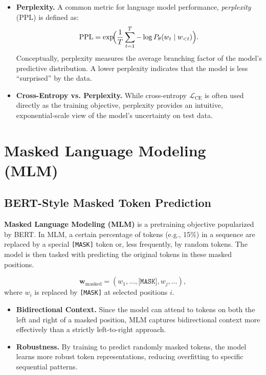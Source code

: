 \begin{itemize}
    \item \textbf{Perplexity.}
    A common metric for language model performance, \emph{perplexity} (PPL) is defined as:
    \[
    \text{PPL} = \exp\!\Bigl(\frac{1}{T}\sum_{t=1}^T -\log P_{\theta}(w_t \mid w_{<t})\Bigr).
    \]
    Conceptually, perplexity measures the average branching factor of the model’s predictive distribution. A lower perplexity indicates that the model is less “surprised” by the data. 
    \item \textbf{Cross-Entropy vs. Perplexity.}
    While cross-entropy \(\mathcal{L}_\text{CE}\) is often used directly as the training objective, perplexity provides an intuitive, exponential-scale view of the model’s uncertainty on test data.
\end{itemize}


\section{Masked Language Modeling (MLM)}
\label{sec:mlm}

\subsection{BERT-Style Masked Token Prediction}
\noindent
\textbf{Masked Language Modeling (MLM)} is a pretraining objective popularized by BERT. In MLM, a certain percentage of tokens (e.g., 15\%) in a sequence are replaced by a special \texttt{[MASK]} token or, less frequently, by random tokens. The model is then tasked with predicting the original tokens in these masked positions.

\[
\mathbf{w}_{\text{masked}} = (w_1, \ldots, \texttt{[MASK]}, w_{j}, \ldots),
\]
where \(w_i\) is replaced by \texttt{[MASK]} at selected positions \(i\). 

\begin{itemize}
    \item \textbf{Bidirectional Context.}
    Since the model can attend to tokens on both the left and right of a masked position, MLM captures bidirectional context more effectively than a strictly left-to-right approach.
    \item \textbf{Robustness.}
    By training to predict randomly masked tokens, the model learns more robust token representations, reducing overfitting to specific sequential patterns.
\end{itemize}

